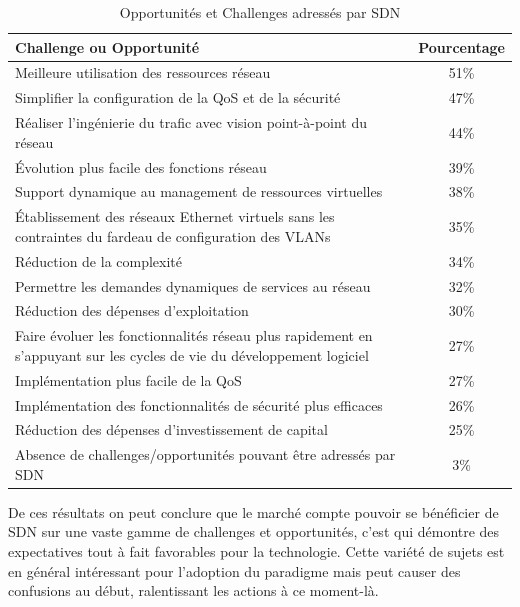 \begin{table}[!h]
\centering
\begin{tabular}{|p{12cm}|c|}
\hline 
\bf Challenge ou Opportunité & \bf Pourcentage \\ 
\hline 
Meilleure utilisation des ressources réseau & 51\% \\ 
\hline 
Simplifier la configuration de la QoS et de la sécurité  & 47\%  \\
\hline 
Réaliser l'ingénierie du trafic avec vision point-à-point du réseau & 44\% \\ 
\hline 
Évolution plus facile des fonctions réseau & 39\% \\ 
\hline 
Support dynamique au management de ressources virtuelles  & 38\% \\ 
\hline 
Établissement des réseaux Ethernet virtuels sans les contraintes du fardeau de configuration des VLANs & 35\% \\ 
\hline 
Réduction de la complexité & 34\% \\ 
\hline 
Permettre les demandes dynamiques de services au réseau & 32\% \\ 
\hline 
Réduction des dépenses d'exploitation & 30\% \\ 
\hline 
Faire évoluer les fonctionnalités réseau plus rapidement en s'appuyant sur les cycles de vie du développement logiciel & 27\% \\ 
\hline 
Implémentation plus facile de la QoS & 27\% \\ 
\hline 
Implémentation des fonctionnalités de sécurité plus efficaces & 26\% \\ 
\hline 
Réduction des dépenses d'investissement de capital & 25\% \\ 
\hline 
Absence de challenges/opportunités pouvant être adressés par SDN & 3\% \\ 
\hline 
\end{tabular}
\caption{Opportunités et Challenges adressés par SDN \cite{2013GuideSDNNVTable11}}
\end{table} 

\clearpage

De ces résultats on peut conclure que le marché compte pouvoir se bénéficier de SDN sur une vaste gamme de challenges et opportunités, c'est qui démontre des expectatives tout à fait favorables pour la technologie. Cette variété de sujets est en général intéressant pour l'adoption du \gls{paradigme} mais peut causer des confusions au début, ralentissant les actions à ce moment-là.

